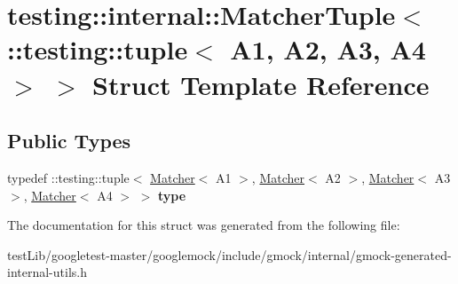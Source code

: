 \hypertarget{structtesting_1_1internal_1_1MatcherTuple_3_01_1_1testing_1_1tuple_3_01A1_00_01A2_00_01A3_00_01A4_01_4_01_4}{}\section{testing\+:\+:internal\+:\+:Matcher\+Tuple$<$ \+:\+:testing\+:\+:tuple$<$ A1, A2, A3, A4 $>$ $>$ Struct Template Reference}
\label{structtesting_1_1internal_1_1MatcherTuple_3_01_1_1testing_1_1tuple_3_01A1_00_01A2_00_01A3_00_01A4_01_4_01_4}
\subsection*{Public Types}
\begin{DoxyCompactItemize}
\item 
\mbox{\label{structtesting_1_1internal_1_1MatcherTuple_3_01_1_1testing_1_1tuple_3_01A1_00_01A2_00_01A3_00_01A4_01_4_01_4_afa578cadfc6b4725920b115d4f7633df}} 
typedef \+::testing\+::tuple$<$ \hyperlink{classtesting_1_1Matcher}{Matcher}$<$ A1 $>$, \hyperlink{classtesting_1_1Matcher}{Matcher}$<$ A2 $>$, \hyperlink{classtesting_1_1Matcher}{Matcher}$<$ A3 $>$, \hyperlink{classtesting_1_1Matcher}{Matcher}$<$ A4 $>$ $>$ {\bfseries type}
\end{DoxyCompactItemize}


The documentation for this struct was generated from the following file\+:\begin{DoxyCompactItemize}
\item 
test\+Lib/googletest-\/master/googlemock/include/gmock/internal/gmock-\/generated-\/internal-\/utils.\+h\end{DoxyCompactItemize}
